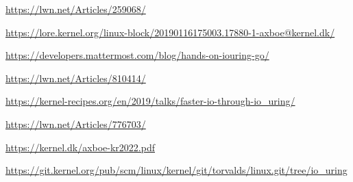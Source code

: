 \documentclass{article}
\begin{document}
\href{https://lwn.net/Articles/259068/}{https://lwn.net/Articles/259068/}

\href{https://lore.kernel.org/linux-block/20190116175003.17880-1-axboe@kernel.dk/}{https://lore.kernel.org/linux-block/20190116175003.17880-1-axboe@kernel.dk/}

\href{https://developers.mattermost.com/blog/hands-on-iouring-go/}{https://developers.mattermost.com/blog/hands-on-iouring-go/}

\href{https://lwn.net/Articles/810414/}{https://lwn.net/Articles/810414/}

\href{https://kernel-recipes.org/en/2019/talks/faster-io-through-io\_uring/}{https://kernel-recipes.org/en/2019/talks/faster-io-through-io\_uring/}

\href{https://lwn.net/Articles/776703/}{https://lwn.net/Articles/776703/}

\href{https://kernel.dk/axboe-kr2022.pdf}{https://kernel.dk/axboe-kr2022.pdf}

\href{https://git.kernel.org/pub/scm/linux/kernel/git/torvalds/linux.git/tree/io\_uring}{https://git.kernel.org/pub/scm/linux/kernel/git/torvalds/linux.git/tree/io\_uring}
\end{document}

